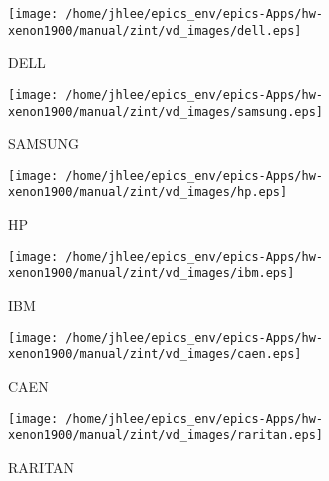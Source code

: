 \noindent
\vspace{1cm}
\begin{minipage}{.2\textwidth}
\begin{center}
\texttt{[image: /home/jhlee/epics\_env/epics-Apps/hw-xenon1900/manual/zint/vd\_images/dell.eps]}
\end{center}
\end{minipage}
\begin{minipage}{.7\textwidth}
DELL
\end{minipage}


\noindent
\vspace{1cm}
\begin{minipage}{.2\textwidth}
\begin{center}
\texttt{[image: /home/jhlee/epics\_env/epics-Apps/hw-xenon1900/manual/zint/vd\_images/samsung.eps]}
\end{center}
\end{minipage}
\begin{minipage}{.7\textwidth}
SAMSUNG
\end{minipage}


\noindent
\vspace{1cm}
\begin{minipage}{.2\textwidth}
\begin{center}
\texttt{[image: /home/jhlee/epics\_env/epics-Apps/hw-xenon1900/manual/zint/vd\_images/hp.eps]}
\end{center}
\end{minipage}
\begin{minipage}{.7\textwidth}
HP
\end{minipage}


\noindent
\vspace{1cm}
\begin{minipage}{.2\textwidth}
\begin{center}
\texttt{[image: /home/jhlee/epics\_env/epics-Apps/hw-xenon1900/manual/zint/vd\_images/ibm.eps]}
\end{center}
\end{minipage}
\begin{minipage}{.7\textwidth}
IBM
\end{minipage}


\noindent
\vspace{1cm}
\begin{minipage}{.2\textwidth}
\begin{center}
\texttt{[image: /home/jhlee/epics\_env/epics-Apps/hw-xenon1900/manual/zint/vd\_images/caen.eps]}
\end{center}
\end{minipage}
\begin{minipage}{.7\textwidth}
CAEN
\end{minipage}


\noindent
\vspace{1cm}
\begin{minipage}{.2\textwidth}
\begin{center}
\texttt{[image: /home/jhlee/epics\_env/epics-Apps/hw-xenon1900/manual/zint/vd\_images/raritan.eps]}
\end{center}
\end{minipage}
\begin{minipage}{.7\textwidth}
RARITAN
\end{minipage}


